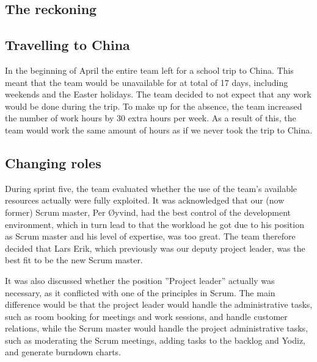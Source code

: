 \subsection{The reckoning}


\subsection{Travelling to China}
In the beginning of April the entire team left for a school trip to China. This meant that the team would be unavailable for at total of 17 days, including weekends and the Easter holidays. The team decided to not expect that any work would be done during the trip. To make up for the absence, the team increased the number of work hours by 30 extra hours per week. As a result of this, the team would work the same amount of hours as if we never took the trip to China.

\subsection{Changing roles}
\label{sec:unbalancedWorkload}
During sprint five, the team evaluated whether the use of the team's available resources actually were fully exploited. It was acknowledged that our (now former) Scrum master, Per Øyvind, had the best control of the development environment, which in turn lead to that the workload he got due to his position as Scrum master and his level of expertise, was too great. The team therefore decided that Lars Erik, which previously was our deputy project leader, was the best fit to be the new Scrum master.

It was also discussed whether the position ''Project leader'' actually was necessary, as it conflicted with one of the principles in Scrum.  The main difference would be that the project leader would handle the administrative tasks, such as room booking for meetings and work sessions, and handle customer relations, while the Scrum master would handle the project administrative tasks, such as moderating the Scrum meetings, adding tasks to the backlog and Yodiz, and generate burndown charts.